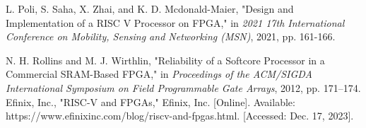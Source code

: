 \documentclass[conference]{IEEEtran}
\begin{document}
\begin{thebibliography}{1}
L. Poli, S. Saha, X. Zhai, and K. D. Mcdonald-Maier, "Design and Implementation of a RISC V Processor on FPGA," in \emph{2021 17th International Conference on Mobility, Sensing and Networking (MSN)}, 2021, pp. 161-166.

N. H. Rollins and M. J. Wirthlin, "Reliability of a Softcore Processor in a Commercial SRAM-Based FPGA," in \emph{Proceedings of the ACM/SIGDA International Symposium on Field Programmable Gate Arrays}, 2012, pp. 171–174.
Efinix, Inc., "RISC-V and FPGAs," Efinix, Inc. [Online]. Available: https://www.efinixinc.com/blog/riscv-and-fpgas.html. [Accessed: Dec. 17, 2023].
\end{thebibliography}

\end{document}
